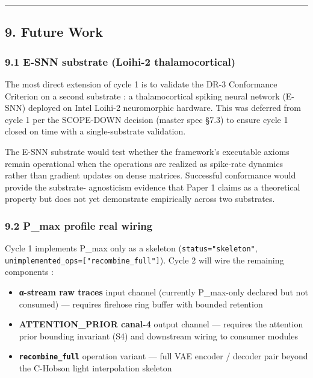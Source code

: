 \documentclass[
]{article}
\providecommand{\tightlist}{%
  \setlength{\itemsep}{0pt}\setlength{\parskip}{0pt}}
\begin{document}
\begin{center}\rule{0.5\linewidth}{0.5pt}\end{center}

\subsection{9. Future Work}\label{future-work}

\subsubsection{9.1 E-SNN substrate (Loihi-2
thalamocortical)}\label{e-snn-substrate-loihi-2-thalamocortical}

The most direct extension of cycle 1 is to validate the DR-3 Conformance
Criterion on a second substrate : a thalamocortical spiking neural
network (E-SNN) deployed on Intel Loihi-2 neuromorphic hardware. This
was deferred from cycle 1 per the SCOPE-DOWN decision (master spec §7.3)
to ensure cycle 1 closed on time with a single-substrate validation.

The E-SNN substrate would test whether the framework's executable axioms
remain operational when the operations are realized as spike-rate
dynamics rather than gradient updates on dense matrices. Successful
conformance would provide the substrate- agnosticism evidence that Paper
1 claims as a theoretical property but does not yet demonstrate
empirically across two substrates.

\subsubsection{9.2 P\_max profile real
wiring}\label{p_max-profile-real-wiring}

Cycle 1 implements P\_max only as a skeleton
(\texttt{status="skeleton"},
\texttt{unimplemented\_ops={[}"recombine\_full"{]}}). Cycle 2 will wire
the remaining components :

\begin{itemize}
\tightlist
\item
  \textbf{α-stream raw traces} input channel (currently P\_max-only
  declared but not consumed) --- requires firehose ring buffer with
  bounded retention
\item
  \textbf{ATTENTION\_PRIOR canal-4} output channel --- requires the
  attention prior bounding invariant (S4) and downstream wiring to
  consumer modules
\item
  \textbf{\texttt{recombine\_full}} operation variant --- full VAE
  encoder / decoder pair beyond the C-Hobson light interpolation
  skeleton
\end{itemize}
\end{document}
